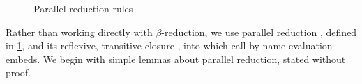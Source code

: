 \documentclass[a4paper,UKenglish,cleveref,autoref,thm-restate]{lipics-v2021}
\begin{document}
\begin{figure}
\caption{Parallel reduction rules}
\label{fig:par}
\end{figure}

Rather than working directly with $\beta$-reduction,
we use parallel reduction ,
defined in \cref{fig:par},
and its reflexive, transitive closure ,
into which call-by-name evaluation embeds.
We begin with simple lemmas about parallel reduction, stated without proof.
\end{document}
